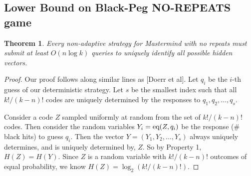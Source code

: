 \documentclass[12pt, a4paper]{article}
\newtheorem{theorem}{Theorem}
\begin{document}
\subsection{Lower Bound on Black-Peg NO-REPEATS game}
\begin{theorem}
Every non-adaptive strategy for Mastermind with no repeats must submit at least
$O(n \log k)$ queries to uniquely identify all possible hidden vectors.
\end{theorem}

\begin{proof}
Our proof follows along similar lines as [Doerr et al]. Let $q_i$ be the $i$-th
guess of our deterministic strategy. Let $s$ be the smallest index such that all
$k!/(k-n)!$ codes are uniquely determined by the responses to $q_1, q_2, \ldots, q_s$.

Consider a code $Z$ sampled uniformly at random from the set of $k!/(k-n)!$ codes. Then
consider the random variables $Y_i = \textnormal{eq}(Z, q_i)$ be the response (\# black
hits) to guess $q_i$.
Then the vector $Y = (Y_1,Y_2,\ldots,Y_s)$ always uniquely determines, and is uniquely
determined by, $Z$. So by Property 1, $H(Z) = H(Y)$. Since $Z$ is a random
variable with $k!/(k-n)!$ outcomes of equal probability, we know
$H(Z) = \log_2(k!/(k-n)!)$.


\end{proof}
\end{document}
